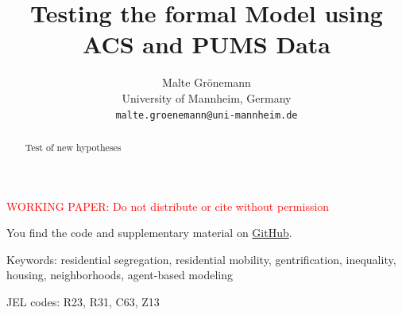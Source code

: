 \documentclass[a4paper,12pt]{article}
\title{Testing the formal Model using ACS and PUMS Data}
\author{Malte Grönemann \\ University of Mannheim, Germany \\ \texttt{malte.groenemann@uni-mannheim.de}}
\begin{document}
\maketitle

\textcolor{red}{WORKING PAPER: Do not distribute or cite without permission}

You find the code and supplementary material on \href{https://github.com/maltegroenemann/soc-econ-housing}{GitHub}.

\begin{abstract} 
Test of new hypotheses
\end{abstract}

Keywords: residential segregation, residential mobility, gentrification, inequality, housing, neighborhoods, agent-based modeling

JEL codes: R23, R31, C63, Z13




\singlespacing
\printbibliography
\end{document}
